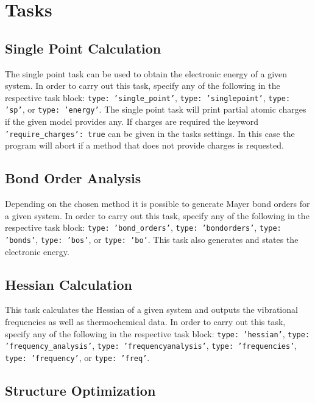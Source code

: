 \documentclass[]{tufte-book}
\begin{document}
\section{Tasks}

\subsection{Single Point Calculation}

The single point task can be used to obtain the electronic energy of a given system. In order to carry out this task,
specify any of the following in the respective task block: \texttt{type: 'single\_point'}, \texttt{type: 'singlepoint'},
\texttt{type: 'sp'}, or \texttt{type: 'energy'}. The single point task will print partial atomic charges if the given
model provides any. If charges are required the keyword \texttt{'require\_charges': true} can be given in the tasks
settings. In this case the program will abort if a method that does not provide charges is requested.

\subsection{Bond Order Analysis}

Depending on the chosen method it is possible to generate Mayer bond orders for a given system. In order to carry out this task,
specify any of the following in the respective task block: \texttt{type: 'bond\_orders'}, \texttt{type: 'bondorders'}, 
\texttt{type: 'bonds'}, \texttt{type: 'bos'}, or \texttt{type: 'bo'}.
This task also generates and states the electronic energy.

\subsection{Hessian Calculation}

This task calculates the Hessian of a given system and outputs the vibrational frequencies as well as thermochemical data. 
In order to carry out this task, specify any of the following in the respective task block: \texttt{type: 'hessian'}, 
\texttt{type: 'frequency\_analysis'}, \texttt{type: 'frequencyanalysis'}, \texttt{type: 'frequencies'}, \texttt{type: 'frequency'}, 
or \texttt{type: 'freq'}.

\subsection{Structure Optimization}
\end{document}
